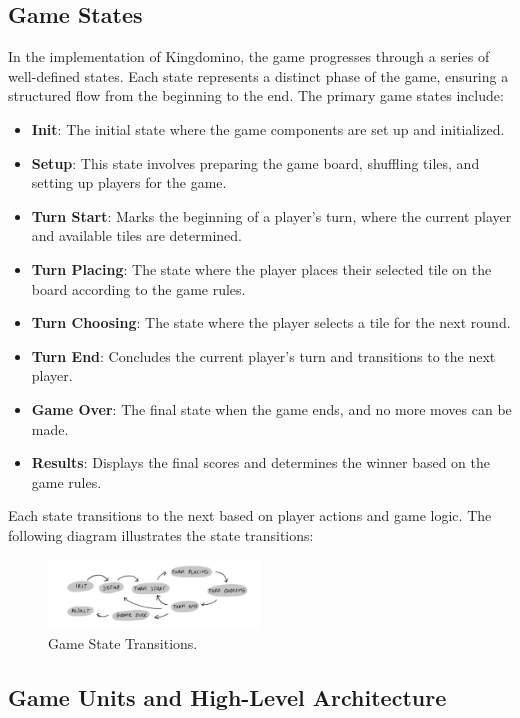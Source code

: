 \documentclass[conference]{IEEEtran}
\begin{document}
\subsection{Game States}

In the implementation of Kingdomino, the game progresses through a series of
well-defined states. Each state represents a distinct phase of the game,
ensuring a structured flow from the beginning to the end. The primary game
states include:

\begin{itemize}
    \item \textbf{Init}: The initial state where the game components are set up and initialized.
    \item \textbf{Setup}: This state involves preparing the game board, shuffling tiles, and setting up players for the game.
    \item \textbf{Turn Start}: Marks the beginning of a player's turn, where the current player and available tiles are determined.
    \item \textbf{Turn Placing}: The state where the player places their selected tile on the board according to the game rules.
    \item \textbf{Turn Choosing}: The state where the player selects a tile for the next round.
    \item \textbf{Turn End}: Concludes the current player's turn and transitions to the next player.
    \item \textbf{Game Over}: The final state when the game ends, and no more moves can be made.
    \item \textbf{Results}: Displays the final scores and determines the winner based on the game rules.
\end{itemize}

Each state transitions to the next based on player actions and game logic. The
following diagram illustrates the state transitions:

\begin{figure}[htbp]
    \centerline{\includegraphics[width=0.50\textwidth]{assets/states.png}}
    \caption{Game State Transitions.}\label{fig:game_states}
\end{figure}

\subsection{Game Units and High-Level Architecture}
\end{document}
